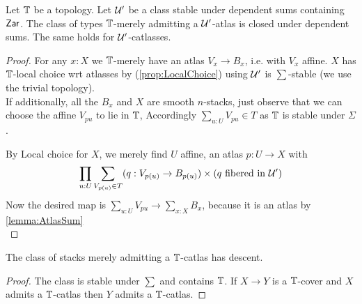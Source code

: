 \begin{theorem}{\label{thm:atlasStableSum}}
	Let $\mathbb{T}$ be a topology.
	Let $\mathcal{U}'$ be a class stable under dependent sums containing $\mathsf{Zar}$.
	The class of types $\mathbb{T}$-merely admitting a $\mathcal{U}'$-atlas is closed under dependent sums. The same holds for $\mathcal{U}'$-catlasses.
\end{theorem}
\begin{proof}
	For any $x : X$ we $\mathbb{T}$-merely have an atlas $V_x \to B_x$, i.e. with $V_x$ affine. %
	$X$ has $\mathbb{T}$-local choice wrt atlasses by (\ref{prop:LocalChoice}) using $\mathcal{U}'$ is $\sum$-stable (we use the trivial topology).\\
	If additionally, all the $B_x$ and $X$ are smooth $n$-stacks, just observe that we can choose the affine $V_{p u}$ to lie in $\mathbb{T}$, Accordingly $\sum_{u : U} V_{p u} \in T$ as $\mathbb{T}$ is stable under $\Sigma$.

	By Local choice for $X$, we merely find $U$ affine, an atlas $p : U \to X$ %
	with
	\[
	\prod_{u : U} \sum_{V_{p(u)} \in T} (q : V_{p(u)} \to B_{p(u)}) \times (q \ \text{fibered in } \mathcal{U}'  )
	\]
	Now the desired map is $\sum_{u : U} V_{p u} \to \sum_{x : X} B_x$, because it is  an atlas %
	by \ref{lemma:AtlasSum} \\
\end{proof}
%
\begin{corollary}{\label{cor:DescentCatlas}}
	The class of stacks merely admitting a $\mathbb{T}$-catlas has descent.
\end{corollary}
\begin{proof}
	The class is stable under $\sum$ and contains $\mathbb{T}$.
	If $X \to Y$ is a $\mathbb{T}$-cover and $X$ admits a $\mathbb{T}$-catlas then $Y$ admits a $\mathbb{T}$-catlas. %
\end{proof}